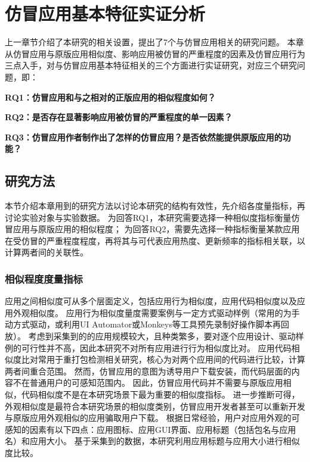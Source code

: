 \chapter{仿冒应用基本特征实证分析}
\label{chp:discoveries_basic}

上一章节介绍了本研究的相关设置，提出了7个与仿冒应用相关的研究问题。
本章从仿冒应用与原版应用相似度、影响应用被仿冒的严重程度的因素及仿冒应用行为三点入手，对与仿冒应用基本特征相关的三个方面进行实证研究，对应三个研究问题，即：

\textbf{RQ1：仿冒应用和与之相对的正版应用的相似程度如何？}

\textbf{RQ2：是否存在显著影响应用被仿冒的严重程度的单一因素？}

\textbf{RQ3：仿冒应用作者制作出了怎样的仿冒应用？是否依然能提供原版应用的功能？}

\section{研究方法}
\label{sec:measure_selection}

本节介绍本章用到的研究方法以讨论本研究的结构有效性，先介绍各度量指标，再讨论实验对象与实验数据。
为回答RQ1，本研究需要选择一种相似度指标衡量仿冒应用与原版应用的相似程度；
为回答RQ2，需要先选择一种指标衡量某款应用在受仿冒的严重程度程度，再将其与可代表应用热度、更新频率的指标相关联，以计算两者间的关联性。

\subsection{相似程度度量指标}

应用之间相似度可从多个层面定义，包括应用行为相似度，应用代码相似度以及应用外观相似度。
应用行为相似度量度需要案例与一定方式驱动样例（常用的为手动方式驱动，或利用UI Automator或Monkeys等工具预先录制好操作脚本再回放）。
考虑到采集到的的应用规模较大，且种类繁多，要对逐个应用设计、驱动样例的可行性并不高，因此本研究不对所有应用进行行为相似度比对。
应用代码相似度比对常用于重打包检测相关研究，核心为对两个应用间的代码进行比较，计算两者间重合范围。
然而，仿冒应用的意图为诱导用户下载安装，而代码层面的内容不在普通用户的可感知范围内。
因此，仿冒应用代码并不需要与原版应用相似，代码相似度不是在本研究场景下最为重要的相似度指标。
进一步推断可得，外观相似度是最符合本研究场景的相似度类别，仿冒应用开发者甚至可以重新开发与原版应用外观相似的应用骗取用户下载。
根据日常经验，用户对应用外观的可感知的因素有以下四点：应用图标、应用GUI界面、应用标题（包括包名与应用名）和应用大小。
基于采集到的数据，本研究利用应用标题与应用大小进行相似度比较。

